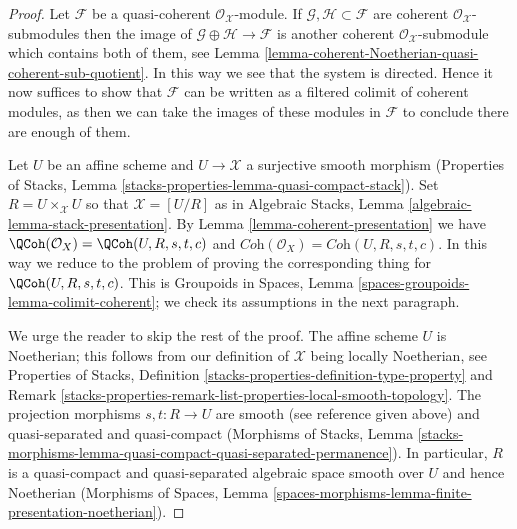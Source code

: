 \begin{proof}
Let $\mathcal{F}$ be a quasi-coherent $\mathcal{O}_\mathcal{X}$-module.
If $\mathcal{G}, \mathcal{H} \subset \mathcal{F}$ are coherent
$\mathcal{O}_\mathcal{X}$-submodules then the image of
$\mathcal{G} \oplus \mathcal{H} \to \mathcal{F}$ is another
coherent $\mathcal{O}_\mathcal{X}$-submodule which contains both of them,
see Lemma \ref{lemma-coherent-Noetherian-quasi-coherent-sub-quotient}.
In this way we see that the system is directed.
Hence it now suffices to show that $\mathcal{F}$ can be written as
a filtered colimit of coherent modules, as then we can take the
images of these modules in $\mathcal{F}$ to conclude there are
enough of them.

\medskip\noindent
Let $U$ be an affine scheme and $U \to \mathcal{X}$
a surjective smooth morphism (Properties of Stacks, Lemma
\ref{stacks-properties-lemma-quasi-compact-stack}).
Set $R = U \times_\mathcal{X} U$ so that $\mathcal{X} = [U/R]$
as in Algebraic Stacks, Lemma \ref{algebraic-lemma-stack-presentation}.
By Lemma \ref{lemma-coherent-presentation} we have
$\QCoh(\mathcal{O}_X) = \QCoh(U, R, s, t, c)$ and
$\textit{Coh}(\mathcal{O}_X) = \textit{Coh}(U, R, s, t, c)$.
In this way we reduce to the problem of proving the corresponding thing for
$\QCoh(U, R, s, t, c)$. This is
Groupoids in Spaces, Lemma \ref{spaces-groupoids-lemma-colimit-coherent};
we check its assumptions in the next paragraph.

\medskip\noindent
We urge the reader to skip the rest of the proof.
The affine scheme $U$ is Noetherian; this follows from our definition
of $\mathcal{X}$ being locally Noetherian, see
Properties of Stacks, Definition
\ref{stacks-properties-definition-type-property} and
Remark \ref{stacks-properties-remark-list-properties-local-smooth-topology}.
The projection morphisms $s, t : R \to U$ are smooth (see reference
given above)
and quasi-separated and quasi-compact (Morphisms of Stacks, Lemma
\ref{stacks-morphisms-lemma-quasi-compact-quasi-separated-permanence}).
In particular, $R$ is a quasi-compact and quasi-separated algebraic space
smooth over $U$ and hence Noetherian
(Morphisms of Spaces, Lemma
\ref{spaces-morphisms-lemma-finite-presentation-noetherian}).
\end{proof}













